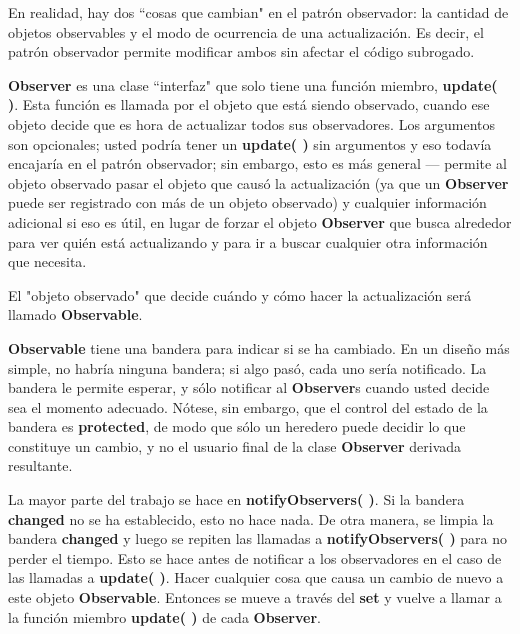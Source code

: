 En realidad, hay dos “cosas que cambian" en el patrón observador: la cantidad de objetos observables y el modo de ocurrencia de una actualización. Es decir, el patrón observador permite modificar ambos sin afectar el código subrogado.


\-\-\-\-\-\-\-\-\-\-\-\-\-  \newline

\textbf{Observer} es una clase “interfaz" que solo tiene una función miembro, \textbf{update( )}. Esta función es llamada por el objeto que está siendo observado, cuando ese objeto decide que es hora de actualizar todos sus observadores. Los argumentos son opcionales; usted podría tener un \textbf{update( )} sin argumentos y eso todavía encajaría en el patrón observador; sin embargo, esto es más general — permite al objeto observado pasar el objeto que causó la actualización (ya que un \textbf{Observer} puede ser registrado con más de un objeto observado) y cualquier información adicional si eso es útil, en lugar de forzar el objeto \textbf{Observer} que busca alrededor para ver quién está actualizando y para ir a buscar cualquier otra información que necesita.    \newline

El "objeto observado" que decide cuándo y cómo hacer la actualización será llamado \textbf{Observable}.   \newline

\textbf{Observable} tiene una bandera para indicar si se ha cambiado. En un diseño más simple, no habría ninguna bandera; si algo pasó, cada uno sería notificado. La bandera le permite esperar, y sólo notificar al \textbf{Observer}s cuando usted decide sea el momento adecuado. Nótese, sin embargo, que el control del estado de la bandera es \textbf{protected}, de modo que sólo un heredero puede decidir lo que constituye un cambio, y no el usuario final de la clase \textbf{Observer} derivada resultante.  \newline

La mayor parte del trabajo se hace en \textbf{notifyObservers( )}. Si la bandera \textbf{changed} no se ha establecido, esto no hace nada. 
De otra manera, se limpia la bandera \textbf{changed} y luego se repiten las llamadas a \textbf{notifyObservers( )} para no perder el tiempo. 
Esto se hace antes de notificar a los observadores en el caso de las llamadas a \textbf{update( )}. Hacer cualquier cosa que causa un cambio de nuevo a este objeto \textbf{Observable}. Entonces se mueve a través del \textbf{set} y vuelve a llamar a la función miembro \textbf{update( )} de cada \textbf{Observer}.   \newline


